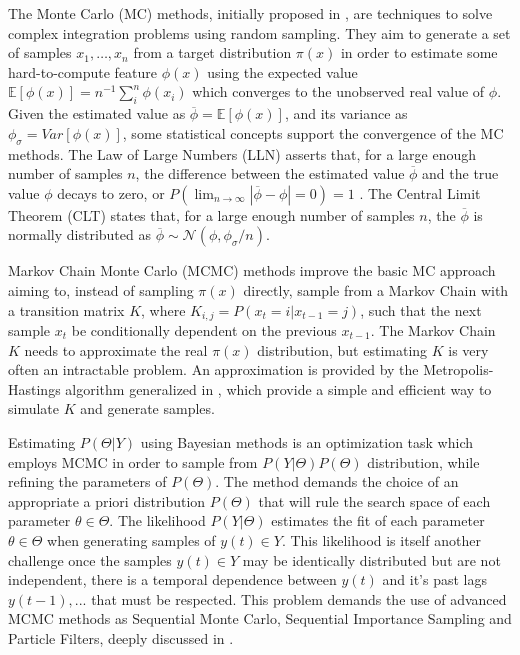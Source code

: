 The Monte Carlo (MC) methods, initially proposed in \cite{Metropolis1949}, are techniques to solve complex  integration problems using random sampling. They aim to generate a set of samples $x_1,\ldots,x_n$ from a target distribution $\pi(x)$ in order to estimate some hard-to-compute feature $\phi(x)$ using the expected value $\mathbb{E}[\phi(x)] = n^{-1}\sum_i^n \phi(x_i)$ which converges to the unobserved real value of $\phi$. Given the estimated value as $\overline{\phi} = \mathbb{E}[\phi(x)]$, and its variance as $\phi_\sigma = Var[\phi(x)]$, some statistical concepts support the convergence of the MC methods. The Law of Large Numbers (LLN) asserts that, for a large enough number of samples $n$, the difference between the estimated value $\overline{\phi}$ and the true value $\phi$ decays to zero, or $P(\lim_{n\to\infty} |\overline{\phi} - \phi| = 0) = 1$ . The Central Limit Theorem (CLT) states that, for a large enough number of samples $n$, the $\overline{\phi}$ is normally distributed as $\overline{\phi} \sim \mathcal{N}(\phi,\phi_\sigma/n)$.


Markov Chain Monte Carlo (MCMC) methods improve the basic MC approach aiming to, instead of sampling $\pi(x)$ directly, sample from a Markov Chain with a transition matrix $K$, where $K_{i,j} = P(x_t = i|x_{t-1} = j)$, such that the next sample $x_t$ be conditionally dependent on the previous $x_{t-1}$. The Markov Chain $K$ needs to approximate the real $\pi(x)$ distribution, but estimating $K$ is very often an intractable problem. An approximation is provided by the Metropolis-Hastings algorithm generalized in \cite{Hastings1970}, which provide a simple and efficient way to simulate $K$ and generate samples. 

Estimating $P(\Theta|Y)$ using Bayesian methods is an optimization task which employs MCMC in order to sample from $P(Y|\Theta)P(\Theta)$ distribution, while refining the parameters of $P(\Theta)$. The method demands the choice of an appropriate a priori distribution $P(\Theta)$ that will rule the search space of each parameter $\theta \in \Theta$. The likelihood $P(Y|\Theta)$ estimates the fit of each parameter $\theta \in \Theta$ when generating samples of $y(t)\in Y$. This likelihood is itself another challenge once the samples $y(t)\in Y$ may be identically distributed but are not independent, there is a temporal dependence between $y(t)$ and it's past lags $y(t-1),...$ that must be respected. This problem demands the use of advanced MCMC methods as Sequential Monte Carlo, Sequential Importance Sampling and Particle Filters, deeply discussed in \cite{Smith2013}.

